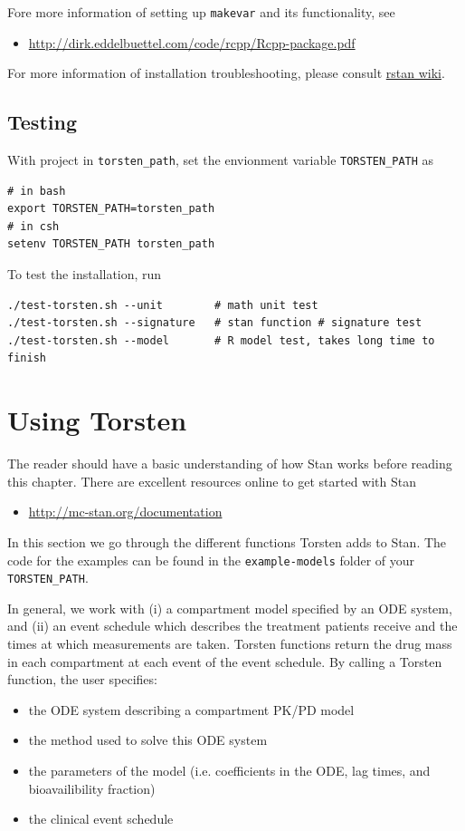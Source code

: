 \documentclass[11pt, reqno, oneside]{amsbook}
\numberwithin{equation}{chapter}
\numberwithin{figure}{chapter}
\numberwithin{table}{chapter}
\theoremstyle{remark}
\begin{document}
Fore more information of setting up \texttt{makevar} and its
functionality, see 
\begin{itemize}
\item \url{http://dirk.eddelbuettel.com/code/rcpp/Rcpp-package.pdf}
\end{itemize}
For more information of installation troubleshooting,
please consult \href{https://github.com/stan-dev/rstan/wiki}{rstan wiki}.

\section{Testing}
\label{sec:org0c40f76}
With project in \texttt{torsten\_path}, set the envionment variable
\texttt{TORSTEN_PATH} as
\begin{verbatim}
# in bash
export TORSTEN_PATH=torsten_path
# in csh
setenv TORSTEN_PATH torsten_path
\end{verbatim}

To test the installation, run
\begin{verbatim}
./test-torsten.sh --unit        # math unit test
./test-torsten.sh --signature   # stan function # signature test
./test-torsten.sh --model       # R model test, takes long time to finish
\end{verbatim}

\chapter{Using Torsten}
\label{sec:org0591584}
The reader should have a basic understanding of how Stan works before
reading this chapter. There are excellent resources online to get
started with Stan
%
\begin{itemize}
\item \href{http://mc-stan.org/documentation}{http://mc-stan.org/documentation}
\end{itemize}
%
In this section we go through the different functions Torsten adds to
Stan. The code for the examples can be found in the \texttt{example-models}
folder of your \texttt{TORSTEN\_PATH}.

In general, we work with (i) a compartment model specified by an ODE system,
and (ii) an event schedule which describes the treatment patients receive and the times
at which measurements are taken.
Torsten functions return the drug mass in each compartment at each event of the event schedule.
By calling a Torsten function, the user specifies:
\begin{itemize}
  \item the ODE system describing a compartment PK/PD model
  \item the method used to solve this ODE system
  \item the parameters of the model (i.e. coefficients in the ODE, lag times, and bioavailibility fraction)
  \item the clinical event schedule
\end{itemize} 
\end{document}
